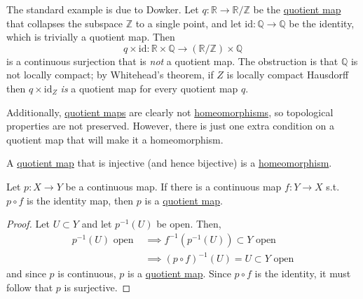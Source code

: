   \begin{example}
    \label{ex:products-of-quotient-maps-are-not-quotient-maps}
    The standard example is due to Dowker. Let $q: \mathbb{R} \to \mathbb{R} / \mathbb{Z}$ be the \hyperref[def:quotient-map]{quotient map} that collapses the subspace $\mathbb{Z}$ to a single point, and let $\mathrm{id}: \mathbb{Q} \to \mathbb{Q}$ be the identity, which is trivially a quotient map. Then
    \begin{equation}
      q \times \mathrm{id}: \mathbb{R} \times \mathbb{Q} \to (\mathbb{R} / \mathbb{Z}) \times \mathbb{Q}
    \end{equation}
    is a continuous surjection that is \textit{not} a quotient map. The obstruction is that $\mathbb{Q}$ is not locally compact; by Whitehead's theorem, if $Z$ is locally compact Hausdorff then $q \times \mathrm{id}_Z$ \textit{is} a quotient map for every quotient map $q$. 
  \end{example}

  Additionally, \hyperref[def:quotient-map]{quotient maps} are clearly not \hyperref[def:homeomorphism]{homeomorphisms}, so topological properties are not preserved. However, there is just one extra condition on a quotient map that will make it a homeomorphism.  

  \begin{lemma}
    \label{thm:bijective-quotient-maps}
    A \hyperref[def:quotient-map]{quotient map} that is injective (and hence bijective) is a \hyperref[def:homeomorphism]{homeomorphism}. 
  \end{lemma} 

	\begin{lemma}
	  \label{thm:retractions-are-quotient-maps-2}
    Let $p: X \to Y$ be a continuous map. If there is a continuous map $f: Y \to X$ s.t. $p \circ f$ is the identity map, then $p$ is a \hyperref[def:quotient-map]{quotient map}. 
  \end{lemma}
  \begin{proof}
    Let $U \subset Y$ and let $p^{-1} (U)$ be open. Then, 
    \begin{align}
      p^{-1} (U) \text{ open } & \implies f^{-1} (p^{-1} (U)) \subset Y \text{ open} \\ 
                               & \implies (p \circ f)^{-1}(U) = U \subset Y \text{ open}
    \end{align}
    and since $p$ is continuous, $p$ is a \hyperref[def:quotient-map]{quotient map}. Since $p \circ f$ is the identity, it must follow that $p$ is surjective. 
  \end{proof}

